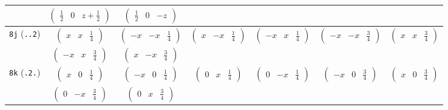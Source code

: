 \documentclass[fleqn,9pt,landscape]{jsarticle}
\begin{document}
\begin{center}
\begin{longtable}{ccccccc}
& $ \begin{pmatrix} \frac{1}{2} & 0 & z + \frac{1}{2} \end{pmatrix} $ & $ \begin{pmatrix} \frac{1}{2} & 0 & - z \end{pmatrix} $ & $  $ & $  $ & $  $ & $  $ \\ \hline
{\tt 8j} ({\tt ..2}) & $ \begin{pmatrix} x & x & \frac{1}{4} \end{pmatrix} $ & $ \begin{pmatrix} - x & - x & \frac{1}{4} \end{pmatrix} $ & $ \begin{pmatrix} x & - x & \frac{1}{4} \end{pmatrix} $ & $ \begin{pmatrix} - x & x & \frac{1}{4} \end{pmatrix} $ & $ \begin{pmatrix} - x & - x & \frac{3}{4} \end{pmatrix} $ & $ \begin{pmatrix} x & x & \frac{3}{4} \end{pmatrix} $ \\
& $ \begin{pmatrix} - x & x & \frac{3}{4} \end{pmatrix} $ & $ \begin{pmatrix} x & - x & \frac{3}{4} \end{pmatrix} $ & $  $ & $  $ & $  $ & $  $ \\ \hline
{\tt 8k} ({\tt .2.}) & $ \begin{pmatrix} x & 0 & \frac{1}{4} \end{pmatrix} $ & $ \begin{pmatrix} - x & 0 & \frac{1}{4} \end{pmatrix} $ & $ \begin{pmatrix} 0 & x & \frac{1}{4} \end{pmatrix} $ & $ \begin{pmatrix} 0 & - x & \frac{1}{4} \end{pmatrix} $ & $ \begin{pmatrix} - x & 0 & \frac{3}{4} \end{pmatrix} $ & $ \begin{pmatrix} x & 0 & \frac{3}{4} \end{pmatrix} $ \\
& $ \begin{pmatrix} 0 & - x & \frac{3}{4} \end{pmatrix} $ & $ \begin{pmatrix} 0 & x & \frac{3}{4} \end{pmatrix} $ & $  $ & $  $ & $  $ & $  $ \\ \hline

\end{longtable}
\end{center}
\end{document}
